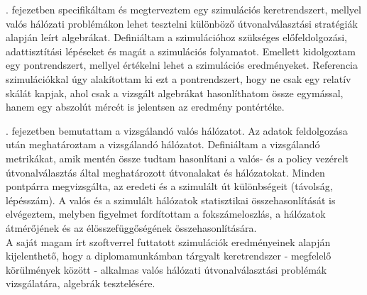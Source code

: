 . fejezetben specifikáltam és megterveztem egy szimulációs keretrendszert, mellyel valós hálózati problémákon lehet tesztelni különböző útvonalválasztási stratégiák alapján leírt algebrákat. Definiáltam a szimulációhoz szükséges előfeldolgozási, adattisztítási lépéseket és magát a szimulációs folyamatot. Emellett kidolgoztam egy pontrendszert, mellyel értékelni lehet a szimulációs eredményeket. Referencia szimulációkkal úgy alakítottam ki ezt a pontrendszert, hogy ne csak egy relatív skálát kapjak, ahol csak a vizsgált algebrákat hasonlíthatom össze egymással, hanem egy abszolút mércét is jelentsen az eredmény pontértéke.

. fejezetben bemutattam a vizsgálandó valós hálózatot. Az adatok feldolgozása után meghatároztam a vizsgálandó hálózatot. Definiáltam a vizsgálandó metrikákat, amik mentén össze tudtam hasonlítani a valós- és a policy vezérelt útvonalválasztás által meghatározott útvonalakat és hálózatokat. Minden pontpárra megvizsgálta, az eredeti és a szimulált út különbségeit (távolság, lépésszám). A valós és a szimulált hálózatok statisztikai összehasonlítását is elvégeztem, melyben figyelmet fordítottam a fokszámeloszlás, a hálózatok átmérőjének és az élösszefüggőségének összehasonlítására.\\

A saját magam írt szoftverrel futtatott szimulációk eredményeinek alapján kijelenthető, hogy a diplomamunkámban tárgyalt keretrendszer - megfelelő körülmények között - alkalmas valós hálózati útvonalválasztási problémák vizsgálatára, algebrák tesztelésére.